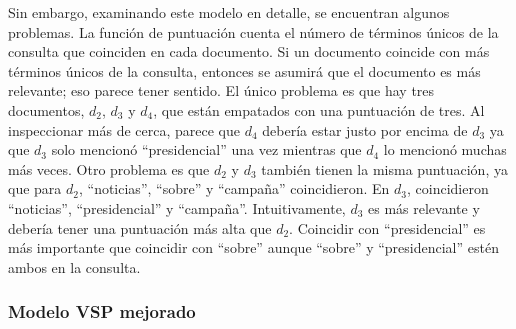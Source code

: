 Sin embargo, examinando este modelo en detalle, se encuentran algunos problemas. La función de puntuación cuenta el número de términos únicos de la consulta que coinciden en cada documento. Si un documento coincide con más términos únicos de la consulta, entonces se asumirá que el documento es más relevante; eso parece tener sentido. El único problema es que hay tres documentos, $d_2$, $d_3$ y $d_4$, que están empatados con una puntuación de tres. Al inspeccionar más de cerca, parece que $d_4$ debería estar justo por encima de $d_3$ ya que $d_3$ solo mencionó ``presidencial'' una vez mientras que $d_4$ lo mencionó muchas más veces. Otro problema es que $d_2$ y $d_3$ también tienen la misma puntuación, ya que para $d_2$, ``noticias'', ``sobre'' y ``campaña'' coincidieron. En $d_3$, coincidieron ``noticias'', ``presidencial'' y ``campaña''. Intuitivamente, $d_3$ es más relevante y debería tener una puntuación más alta que $d_2$. Coincidir con ``presidencial'' es más importante que coincidir con ``sobre'' aunque ``sobre'' y ``presidencial'' estén ambos en la consulta.

\subsubsection{Modelo VSP mejorado}

